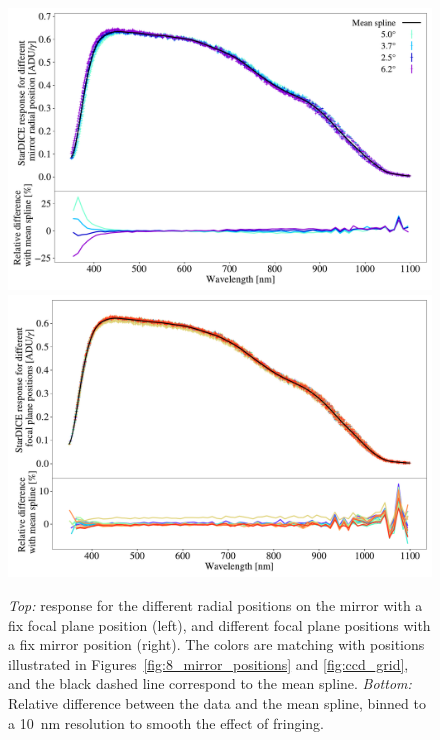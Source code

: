 \begin{figure}[ht]
    \centering
    \includegraphics[width=\columnwidth]{fig/radial_positions.pdf}
    \includegraphics[width=\columnwidth]{fig/ccd_positions.pdf}
    \caption{\textit{Top:} \SD response for the different radial positions on the mirror with a fix focal plane position (left), and different focal plane positions  with a fix mirror position (right). The colors are matching with positions illustrated in Figures~\ref{fig:8_mirror_positions} and \ref{fig:ccd_grid}, and the black dashed line correspond to the mean spline. \textit{Bottom:} Relative difference between the data and the mean spline, binned to a \SI{10}{\nano\meter} resolution to smooth the effect of fringing.}
    \label{fig:radial_positions}
\end{figure}

